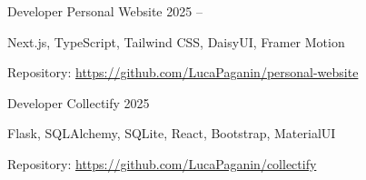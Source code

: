 \begin{cventries}

\cventry
{Developer} %
{Personal Website} %
{} %
{2025 -- } %
{ %
\begin{cvitems}
  \item {}
  \item Next.js, TypeScript, Tailwind CSS, DaisyUI, Framer Motion
  \item {Repository: \url{https://github.com/LucaPaganin/personal-website}}  
\end{cvitems}
}


\cventry
{Developer} %
{Collectify} %
{} %
{2025} %
{ %
\begin{cvitems}
  \item {}
  \item {}
  \item {}
  \item {Flask, SQLAlchemy, SQLite, React, Bootstrap, MaterialUI}
  \item {Repository: \url{https://github.com/LucaPaganin/collectify}}  
\end{cvitems}
}

\end{cventries}